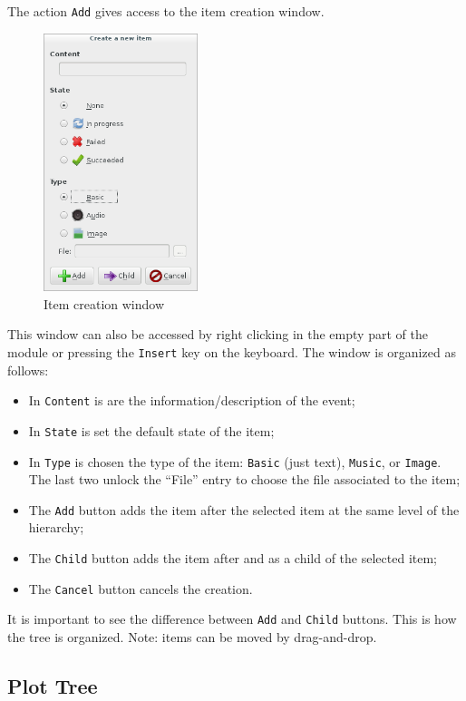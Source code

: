 \documentclass[a4paper,12pt]{article}
\newcommand*{\interfaceitem}[1]{\texttt{#1}}
\begin{document}
The action \interfaceitem{Add} gives access to the item creation window.
\begin{figure}[ht]
    \centerline{\includegraphics[width=0.4\textwidth]{add_item}}
    \caption{Item creation window}
    \label{fig:ajout}
\end{figure}
This window can also be accessed by right clicking in the empty part of the module or pressing the \interfaceitem{Insert} key on the keyboard.
The window is organized as follows:
\begin{itemize}
    \item In \interfaceitem{Content} is are the information/description of the event;
    \item In \interfaceitem{State} is set the default state of the item;
    \item In \interfaceitem{Type} is chosen the type of the item: \interfaceitem{Basic} (just text), \interfaceitem{Music}, or \interfaceitem{Image}. The last two unlock the ``File'' entry to choose the file associated to the item;
    \item The \interfaceitem{Add} button adds the item after the selected item at the same level of the hierarchy;
    \item The \interfaceitem{Child} button adds the item after and as a child of the selected item;
    \item The \interfaceitem{Cancel} button cancels the creation.
\end{itemize}
It is important to see the difference between \interfaceitem{Add} and \interfaceitem{Child} buttons. This is how the tree is organized.
Note: items can be moved by drag-and-drop.

\subsection{Plot Tree}
\label{sec:plot}
\end{document}
